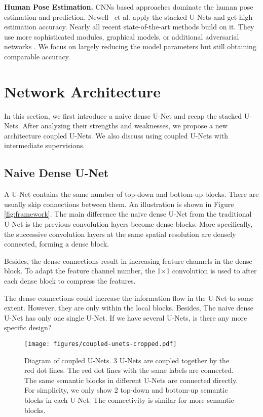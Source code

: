 \documentclass{bmvc2k}
\begin{document}
{\bf Human Pose Estimation.}
CNNs based approaches \cite{wei2016convolutional,pishchulin2016deepcut,lifshitz2016human,zhao2018learning} dominate the human pose estimation and prediction. Newell {\ et al.} \cite{newell2016stacked} apply the stacked U-Nets and get high estimation accuracy. Nearly all recent state-of-the-art methods \cite{chu2017multi,yang2017learning,yu2017adversarial,peng2018jointly} build on it. They use more sophisticated modules, graphical models, or additional adversarial networks \cite{tian2018cr,zhu2018generative}. We focus on largely reducing the model parameters but still obtaining comparable accuracy. 

%
 \section{Network Architecture}
In this section, we first introduce a naive dense U-Net and recap the stacked U-Nets. After analyzing their strengths and weaknesses, we propose a new architecture coupled U-Nets. We also discuss using coupled U-Nets with intermediate supervisions.



\subsection{Naive Dense U-Net}
A U-Net \cite{ronneberger2015u} contains the same number of top-down and bottom-up blocks. There are usually skip connections between them. An illustration is shown in Figure \ref{fig:framework}. The main difference the naive dense U-Net from the traditional U-Net is the previous convolution layers become dense blocks. More specifically, the successive convolution layers at the same spatial resolution are densely connected, forming a dense block. 

Besides, the dense connections result in increasing feature channels in the dense block. To adapt the feature channel number, the 1$\times$1 convolution is used to after each dense block to compress the features.



The dense connections could increase the information flow in the U-Net to some extent. However, they are only within the local blocks. Besides, The naive dense U-Net has only one single U-Net. If we have several U-Nets, is there any more specific design?

\begin{figure*}[t!]
\centering
  \texttt{[image: figures/coupled-unets-cropped.pdf]}
\caption{Diagram of coupled U-Nets. 3 U-Nets are coupled together by the red dot lines. The red dot lines with the same labels are connected. The same semantic blocks in different U-Nets are connected directly. For simplicity, we only show 2 top-down and bottom-up semantic blocks in each U-Net. The connectivity is similar for more semantic blocks.}
\label{fig:coupled-unet}
\end{figure*}
\end{document}
